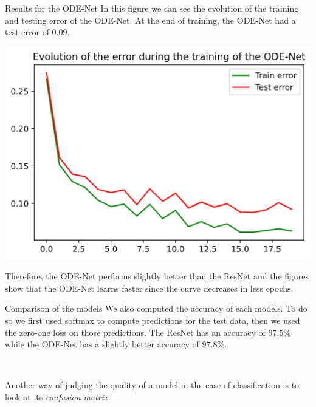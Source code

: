 \documentclass[11pt]{beamer}
\begin{document}
\begin{frame}{Results for the ODE-Net}
In this figure we can see the evolution of the training and testing error of the ODE-Net. At the end of training, the ODE-Net had a test error of $0.09$.
\begin{center}
\includegraphics[scale=0.4]{odenet_rd_loss.png}
\end{center}
Therefore, the ODE-Net performs slightly better than the ResNet and the figures show that the ODE-Net learns faster since the curve decreases in less epochs.
\end{frame}

\begin{frame}{Comparison of the models}
We also computed the accuracy of each models. To do so we first used softmax to compute predictions for the test data, then we used the zero-one loss on those predictions. The ResNet has an accuracy of $97.5\%$ while the ODE-Net has a slightly better accuracy of $97.8\%$.

~

Another way of judging the quality of a model in the case of classification is to look at its \textit{confusion matrix}.
\end{frame}
\end{document}
